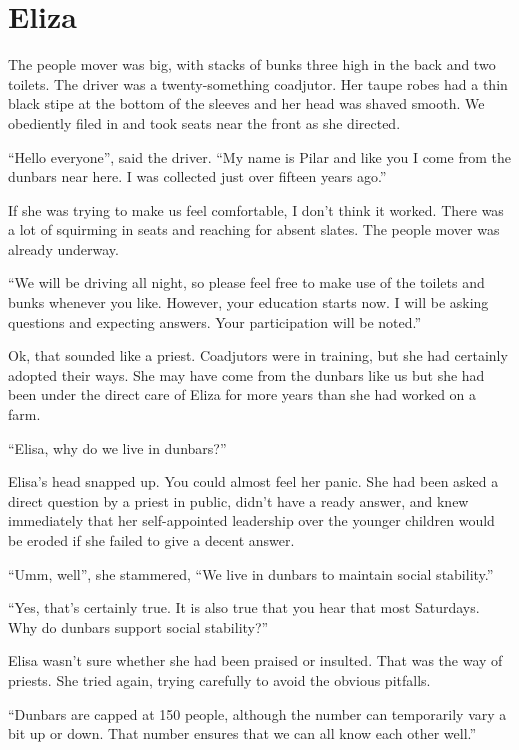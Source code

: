 %
%

\chapter{Eliza}

The people mover was big, with stacks of bunks three high in the back and two toilets. The driver was a twenty-something coadjutor. Her taupe robes had a thin black stipe at the bottom of the sleeves and her head was shaved smooth. We obediently filed in and took seats near the front as she directed.

``Hello everyone'', said the driver. ``My name is Pilar and like you I come from the dunbars near here. I was collected just over fifteen years ago.''

If she was trying to make us feel comfortable, I don't think it worked. There was a lot of squirming in seats and reaching for absent slates. The people mover was already underway.

``We will be driving all night, so please feel free to make use of the toilets and bunks whenever you like. However, your education starts now. I will be asking questions and expecting answers. Your participation will be noted.''

Ok, that sounded like a priest. Coadjutors were in training, but she had certainly adopted their ways. She may have come from the dunbars like us but she had been under the direct care of Eliza for more years than she had worked on a farm.

``Elisa, why do we live in dunbars?''

Elisa's head snapped up. You could almost feel her panic. She had been asked a direct question by a priest in public, didn't have a ready answer, and knew immediately that her self-appointed leadership over the younger children would be eroded if she failed to give a decent answer.

``Umm, well'', she stammered, ``We live in dunbars to maintain social stability.''

``Yes, that's certainly true. It is also true that you hear that most Saturdays. Why do dunbars support social stability?''

Elisa wasn't sure whether she had been praised or insulted. That was the way of priests. She tried again, trying  carefully to avoid the obvious pitfalls.

``Dunbars are capped at 150 people, although the number can temporarily vary a bit up or down. That number ensures that we can all know each other well.''

